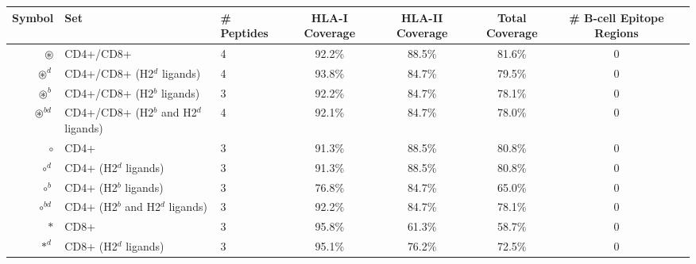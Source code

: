 \begin{tabular}{rllccccc}
\toprule
                                              Symbol &                                      Set &  \# Peptides & HLA-I Coverage & HLA-II Coverage & Total Coverage &  \# B-cell Epitope Regions \\
\midrule
                                     $ \circledast $ &                                CD4+/CD8+ &            4 &         92.2\% &          88.5\% &         81.6\% &                          0 \\
                                   $ \circledast^d $ &               CD4+/CD8+ (H2$^d$ ligands) &            4 &         93.8\% &          84.7\% &         79.5\% &                          0 \\
                                   $ \circledast^b $ &               CD4+/CD8+ (H2$^b$ ligands) &            3 &         92.2\% &          84.7\% &         78.1\% &                          0 \\
                                $ \circledast^{bd} $ &    CD4+/CD8+ (H2$^b$ and H2$^d$ ligands) &            4 &         92.1\% &          84.7\% &         78.0\% &                          0 \\
                                           $ \circ $ &                                     CD4+ &            3 &         91.3\% &          88.5\% &         80.8\% &                          0 \\
                                         $ \circ^d $ &                    CD4+ (H2$^d$ ligands) &            3 &         91.3\% &          88.5\% &         80.8\% &                          0 \\
                                         $ \circ^b $ &                    CD4+ (H2$^b$ ligands) &            3 &         76.8\% &          84.7\% &         65.0\% &                          0 \\
                                      $ \circ^{bd} $ &         CD4+ (H2$^b$ and H2$^d$ ligands) &            3 &         92.2\% &          84.7\% &         78.1\% &                          0 \\
                                            $ \ast $ &                                     CD8+ &            3 &         95.8\% &          61.3\% &         58.7\% &                          0 \\
                                          $ \ast^d $ &                    CD8+ (H2$^d$ ligands) &            3 &         95.1\% &          76.2\% &         72.5\% &                          0 \\

\end{tabular}

